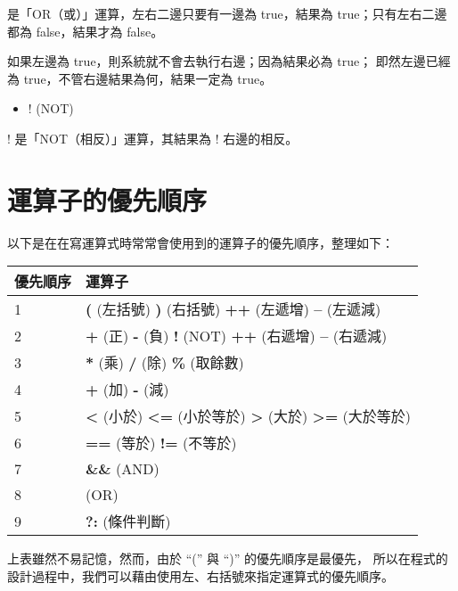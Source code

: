 \documentclass[a4paper,12pt,english]{sphinxmanual}
\begin{document}
\textbar{}\textbar{} 是「OR（或）」運算，左右二邊只要有一邊為 true，結果為 true；只有左右二邊都為 false，結果才為 false。

如果左邊為 true，則系統就不會去執行右邊；因為結果必為 true；
即然左邊已經為 true，不管右邊結果為何，結果一定為 true。
\begin{itemize}
\item {} 
! (NOT)

\end{itemize}

! 是「NOT（相反）」運算，其結果為 ! 右邊的相反。


\section{運算子的優先順序}
\label{java_cond:id4}
以下是在在寫運算式時常常會使用到的運算子的優先順序，整理如下：

\begin{tabulary}{\linewidth}{|L|L|}
\hline
\textbf{
優先順序
} & \textbf{
運算子
}\\
\hline

1
 & 
\textbf{(} (左括號)  \textbf{)} (右括號) \textbf{++} (左遞增) \textbf{--} (左遞減)
\\

2
 & 
\textbf{+} (正) \textbf{-} (負) \textbf{!} (NOT) \textbf{++} (右遞增) \textbf{--} (右遞減)
\\

3
 & 
\textbf{*} (乘) \textbf{/} (除) \textbf{\%} (取餘數)
\\

4
 & 
\textbf{+} (加) \textbf{-} (減)
\\

5
 & 
\textbf{\textless{}} (小於) \textbf{\textless{}=} (小於等於) \textbf{\textgreater{}} (大於) \textbf{\textgreater{}=} (大於等於)
\\

6
 & 
\textbf{==} (等於) \textbf{!=} (不等於)
\\

7
 & 
\textbf{\&\&} (AND)
\\

8
 & 
\textbf{\textbar{}\textbar{}} (OR)
\\

9
 & 
\textbf{?:} (條件判斷)
\\
\hline
\end{tabulary}


上表雖然不易記憶，然而，由於 ``('' 與 ``)'' 的優先順序是最優先，
所以在程式的設計過程中，我們可以藉由使用左、右括號來指定運算式的優先順序。
\end{document}
